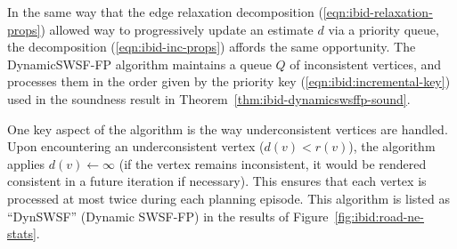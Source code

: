 In the same way that the edge relaxation decomposition
(\ref{eqn:ibid-relaxation-props}) allowed way to progressively
update an estimate $d$ via a priority queue,
the decomposition (\ref{eqn:ibid-inc-props}) affords the same
opportunity.
The DynamicSWSF-FP algorithm \citep{ramalingam1996dynamicswsffp}
maintains a queue $Q$ of inconsistent vertices,
and processes them in the order given by the priority key
(\ref{eqn:ibid:incremental-key})
used in the soundness result
in Theorem~\ref{thm:ibid-dynamicswsffp-sound}.

One key aspect of the algorithm is the way underconsistent vertices
are handled.
Upon encountering an underconsistent vertex ($d(v) < r(v)$),
the algorithm applies $d(v) \leftarrow \infty$
(if the vertex remains inconsistent, it would be rendered
consistent in a future iteration if necessary).
This ensures that each vertex is processed at most twice during
each planning episode.
This algorithm is listed as ``DynSWSF''
(Dynamic SWSF-FP)
in the results of Figure~\ref{fig:ibid:road-ne-stats}.

